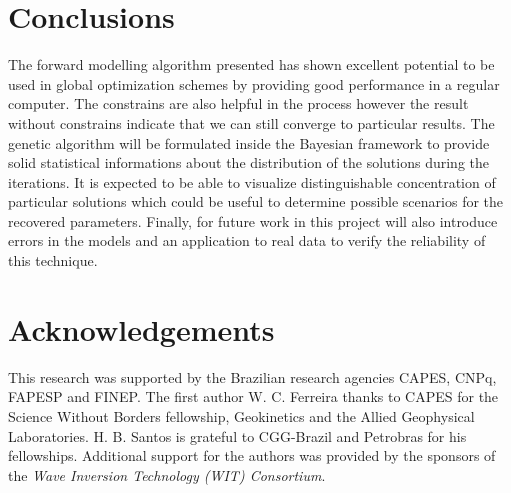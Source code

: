 \documentclass{vie16}
\begin{document}
\begin{table}[h!]
\end{table}

\section{Conclusions}
The forward modelling algorithm presented has shown excellent potential to 
be used in global optimization schemes by providing good performance in a 
regular computer. The constrains are also helpful in the process however the 
result without constrains indicate that we can still converge to particular 
results. The genetic algorithm will be formulated inside the Bayesian 
framework to provide solid statistical informations about the distribution of 
the solutions during the iterations. It is expected to be able to visualize 
distinguishable concentration of particular solutions which could be useful 
to determine possible scenarios for the recovered parameters. Finally, for 
future work in this project will also introduce errors in the models and an 
application to real data to verify the reliability of this technique.

\section{Acknowledgements}
This research was supported by the Brazilian research agencies CAPES, CNPq, 
FAPESP and FINEP. The first author W. C. Ferreira thanks to CAPES for the 
Science Without Borders fellowship, Geokinetics and the Allied Geophysical 
Laboratories. H. B. Santos is grateful to CGG-Brazil and Petrobras for his 
fellowships. Additional support for the authors was provided by the 
sponsors of the \textit{Wave Inversion Technology (WIT) Consortium}.


\end{document}
